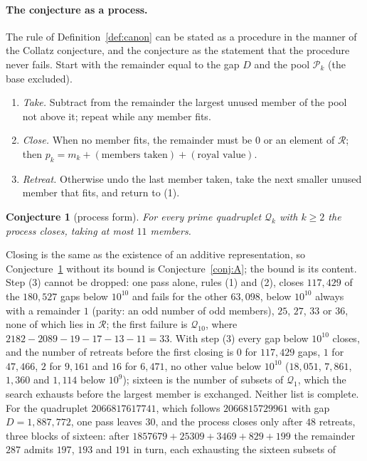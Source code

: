 \documentclass[11pt,a4paper]{article}
\newtheorem{conjecture}{Conjecture}
\newcommand{\Q}{\mathcal{Q}}
\newcommand{\Pool}{\mathcal{P}}
\newcommand{\R}{\mathcal{R}}
\begin{document}
\paragraph{The conjecture as a process.}
The rule of Definition~\ref{def:canon} can be stated as a procedure in the
manner of the Collatz conjecture, and the conjecture as the statement that
the procedure never fails. Start with the remainder equal to the gap $D$ and
the pool $\Pool_k$ (the base excluded).
\begin{enumerate}
\item[(1)] \emph{Take.} Subtract from the remainder the largest unused
  member of the pool not above it; repeat while any member fits.
\item[(2)] \emph{Close.} When no member fits, the remainder must be $0$ or
  an element of $\R$; then $p_k=m_k+(\text{members taken})+(\text{royal value})$.
\item[(3)] \emph{Retreat.} Otherwise undo the last member taken, take the
  next smaller unused member that fits, and return to (1).
\end{enumerate}
\begin{conjecture}[process form]
\label{conj:P}
For every prime quadruplet $\Q_k$ with $k\ge2$ the process closes, taking at
most $11$ members.
\end{conjecture}
Closing is the same as the existence of an additive representation, so
Conjecture~\ref{conj:P} without its bound is Conjecture~\ref{conj:A};
the bound is its content. Step (3) cannot be dropped: one pass alone,
rules (1) and (2), closes $117{,}429$ of the $180{,}527$ gaps below $10^{10}$
and fails for the other $63{,}098$, below $10^{10}$ always with a remainder $1$
(parity: an odd number of odd members), $25$, $27$, $33$ or $36$, none of which
lies in $\R$; the first failure is $\Q_{10}$, where $2182-2089-19-17-13-11=33$.
With step (3) every gap below $10^{10}$ closes, and the number of retreats
before the first closing is $0$ for $117{,}429$ gaps, $1$ for $47{,}466$, $2$
for $9{,}161$ and $16$ for $6{,}471$, no other value below $10^{10}$
($18{,}051$, $7{,}861$, $1{,}360$ and $1{,}114$ below $10^9$); sixteen is the
number of subsets of $\Q_1$, which the search exhausts before the largest
member is exchanged. Neither list is complete. For the quadruplet
$2066817617741$, which follows $2066815729961$ with gap $D=1{,}887{,}772$, one
pass leaves $30$, and the process closes only after $48$ retreats, three
blocks of sixteen: after $1857679+25309+3469+829+199$ the remainder $287$
admits $197$, $193$ and $191$ in turn, each exhausting the sixteen subsets of
\end{document}
